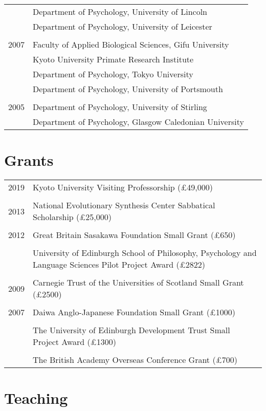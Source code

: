 \documentclass[11pt]{article}
\begin{document}
\begin{longtable}{p{3cm}p{12cm}}
\\
& Department of Psychology, University of Lincoln \\
& Department of Psychology, University of Leicester \\ \\
2007 & Faculty of Applied Biological Sciences, Gifu University \\
& Kyoto University Primate Research Institute \\
& Department of Psychology, Tokyo University \\
& Department of Psychology, University of Portsmouth \\ \\
2005 & Department of Psychology, University of Stirling \\
& Department of Psychology, Glasgow Caledonian University
\end{longtable}

\section*{Grants}
\begin{tabular}{p{3cm}p{12cm}}
2019 & Kyoto University Visiting Professorship (£49,000) \\ \\
2013 & National Evolutionary Synthesis Center Sabbatical Scholarship
(£25,000) \\ \\
2012 & Great Britain Sasakawa Foundation Small Grant (£650) \\ \\
& University of Edinburgh School of Philosophy, Psychology and
Language Sciences Pilot Project Award (£2822) \\ \\
2009 & Carnegie Trust of the Universities of Scotland Small Grant
(£2500) \\ \\
2007 & Daiwa Anglo-Japanese Foundation Small Grant (£1000) \\ \\
& The University of Edinburgh Development Trust Small Project Award
(£1300) \\ \\
& The British Academy Overseas Conference Grant (£700)
\end{tabular}

\section*{Teaching}
\end{document}
